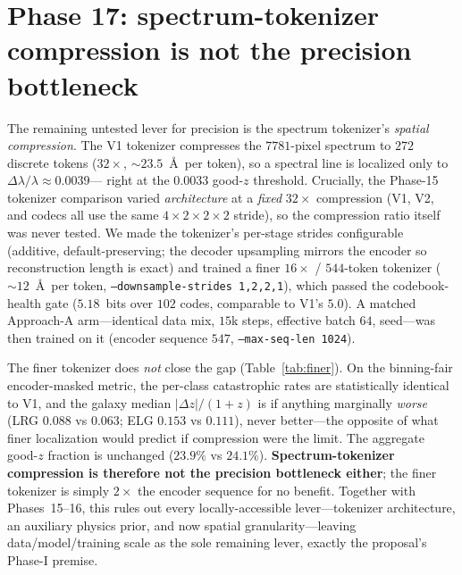 \documentclass[11pt,letterpaper]{article}
\begin{document}
\section{Phase 17: spectrum-tokenizer compression is not the precision bottleneck}
\label{sec:phase17}

The remaining untested lever for precision is the spectrum tokenizer's
\emph{spatial compression}. The V1 tokenizer compresses the $7781$-pixel
spectrum to $272$ discrete tokens ($32{\times}$, ${\sim}23.5$~\AA\ per token), so
a spectral line is localized only to $\Delta\lambda/\lambda \approx 0.0039$---
right at the $0.0033$ good-$z$ threshold. Crucially, the Phase-15 tokenizer
comparison varied \emph{architecture} at a \emph{fixed} $32{\times}$ compression
(V1, V2, and codecs all use the same $4{\times}2{\times}2{\times}2$ stride), so
the compression ratio itself was never tested. We made the tokenizer's per-stage
strides configurable (additive, default-preserving; the decoder upsampling
mirrors the encoder so reconstruction length is exact) and trained a finer
$16{\times}$ / $544$-token tokenizer (${\sim}12$~\AA\ per token,
\texttt{--downsample-strides 1,2,2,1}), which passed the codebook-health gate
($5.18$~bits over $102$ codes, comparable to V1's $5.0$). A matched Approach-A
arm---identical data mix, $15$k steps, effective batch $64$, seed---was then
trained on it (encoder sequence $547$, \texttt{--max-seq-len 1024}).

The finer tokenizer does \emph{not} close the gap (Table~\ref{tab:finer}). On
the binning-fair encoder-masked metric, the per-class catastrophic rates are
statistically identical to V1, and the galaxy median $|\Delta z|/(1{+}z)$ is if
anything marginally \emph{worse} (LRG $0.088$ vs $0.063$; ELG $0.153$ vs
$0.111$), never better---the opposite of what finer localization would predict
if compression were the limit. The aggregate good-$z$ fraction is unchanged
($23.9\%$ vs $24.1\%$). \textbf{Spectrum-tokenizer compression is therefore not
the precision bottleneck either}; the finer tokenizer is simply $2{\times}$ the
encoder sequence for no benefit. Together with Phases~15--16, this rules out
every locally-accessible lever---tokenizer architecture, an auxiliary physics
prior, and now spatial granularity---leaving data/model/training scale as the
sole remaining lever, exactly the proposal's Phase-I premise.
\end{document}
